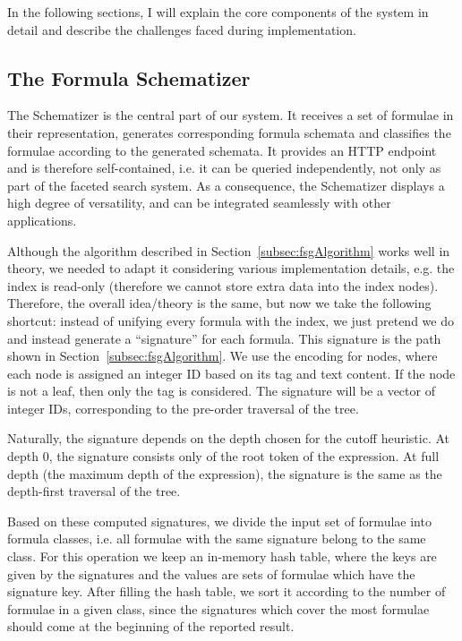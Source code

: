 In the following sections, I will explain the core components of
the system in detail and describe the challenges faced during
implementation.

\subsection{The Formula Schematizer}\label{subsec:fschematizer}
The Schematizer is the central part of our system. It receives a set of
formulae in their \cmml representation, generates corresponding formula
schemata and classifies the formulae according to the generated schemata.
It provides an HTTP endpoint and is therefore self-contained, i.e. it can be
queried independently, not only as part of the faceted search system.
As a consequence, the Schematizer displays a high degree of versatility,
and can be integrated seamlessly with other applications.

Although the algorithm described in Section~\ref{subsec:fsgAlgorithm} works
well in theory, we needed to adapt it considering various \mws implementation
details, e.g. the index is read-only (therefore we cannot store extra data into
the index nodes). Therefore, the overall idea/theory is the same, but now we take the
following shortcut: instead of unifying every formula with the index, we just
pretend we do and instead generate a ``signature'' for each formula. This
signature is the path shown in Section~\ref{subsec:fsgAlgorithm}. We use the
\mws encoding for \mathml nodes, where each node is assigned an integer ID
based on its tag and text content. If the node is not a leaf, then only the tag
is considered. The signature will be a vector of integer IDs, corresponding to
the pre-order traversal of the \cmml tree.

Naturally, the signature depends on the depth chosen for the cutoff heuristic.
At depth 0, the signature consists only of the root token of the \cmml
expression. At full depth (the maximum depth of the expression), the signature
is the same as the depth-first traversal of the \cmml tree.

Based on these computed signatures, we divide the input set of formulae into
formula classes, i.e. all formulae with the same signature belong to the same
class. For this operation we keep an in-memory hash table, where the keys are
given by the signatures and the values are sets of formulae which have the
signature key. After filling the hash table, we sort it according to the number
of formulae in a given class, since the signatures which cover the most
formulae should come at the beginning of the reported result.

